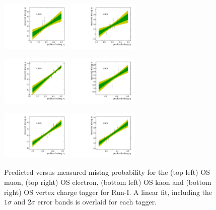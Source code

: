 \clearpage
\begin{figure}[h]
\centering
\includegraphics[height=!,width=0.3\textwidth]{figs/Tagging/Run1/OS_Muon_Calibration.pdf}
\includegraphics[height=!,width=0.3\textwidth]{figs/Tagging/Run1/OS_Electron_Calibration.pdf}

\includegraphics[height=!,width=0.3\textwidth]{figs/Tagging/Run1/OS_nnetKaon_Calibration.pdf}
\includegraphics[height=!,width=0.3\textwidth]{figs/Tagging/Run1/VtxCharge_Calibration.pdf}
\caption{\small Predicted versus measured mistag probability for the (top left) OS muon, (top right) OS electron, (bottom left) OS kaon and (bottom right) OS vertex charge tagger for Run-I. 
A linear fit, including the $1\sigma$ and $2\sigma$ error bands is overlaid for each tagger.}
\label{fig:OSdistribution_Run1}
%
\centering
\includegraphics[height=!,width=0.3\textwidth]{figs/Tagging/Run2/OS_Muon_Calibration.pdf}
\includegraphics[height=!,width=0.3\textwidth]{figs/Tagging/Run2/OS_Electron_Calibration.pdf}


\end{figure}
